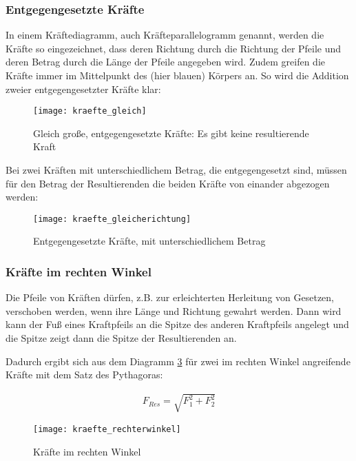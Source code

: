 \subsubsection{Entgegengesetzte Kräfte}

In einem Kräftediagramm, auch Kräfteparallelogramm genannt, werden die Kräfte so eingezeichnet, dass deren Richtung durch die Richtung der Pfeile und deren Betrag durch die Länge der Pfeile angegeben wird. Zudem greifen die Kräfte immer im Mittelpunkt des (hier blauen) Körpers an. So wird die Addition zweier entgegengesetzter Kräfte klar:

\begin{figure}[h!]
	\centering
	\texttt{[image: kraefte\_gleich]}
	\caption{Gleich große, entgegengesetzte Kräfte: Es gibt keine resultierende Kraft}
	\label{fig:kraefte_gleich}
\end{figure}

\noindent Bei zwei Kräften mit unterschiedlichem Betrag, die entgegengesetzt sind, müssen für den Betrag der Resultierenden die beiden Kräfte von einander abgezogen werden:

\begin{figure}[h!]
	\centering
	\texttt{[image: kraefte\_gleicherichtung]}
	\caption{Entgegengesetzte Kräfte, mit unterschiedlichem Betrag}
	\label{fig:kraefte_gleicherichtung}
\end{figure}

\subsubsection{Kräfte im rechten Winkel}

\noindent Die Pfeile von Kräften dürfen, z.B. zur erleichterten Herleitung von Gesetzen, verschoben werden, wenn ihre Länge und Richtung gewahrt werden. Dann wird kann der Fuß eines Kraftpfeils an die Spitze des anderen Kraftpfeils angelegt und die Spitze zeigt dann die Spitze der Resultierenden an.

Dadurch ergibt sich aus dem Diagramm \ref{fig:kraefte_rechterwinkel} für zwei im rechten Winkel angreifende Kräfte mit dem Satz des Pythagoras:

\begin{align}
	F_{Res} = \sqrt{F_1^2 + F_2^2}
\end{align}

\begin{figure}[h!]
	\centering
	\texttt{[image: kraefte\_rechterwinkel]}
	\caption{Kräfte im rechten Winkel}
	\label{fig:kraefte_rechterwinkel}
\end{figure}


